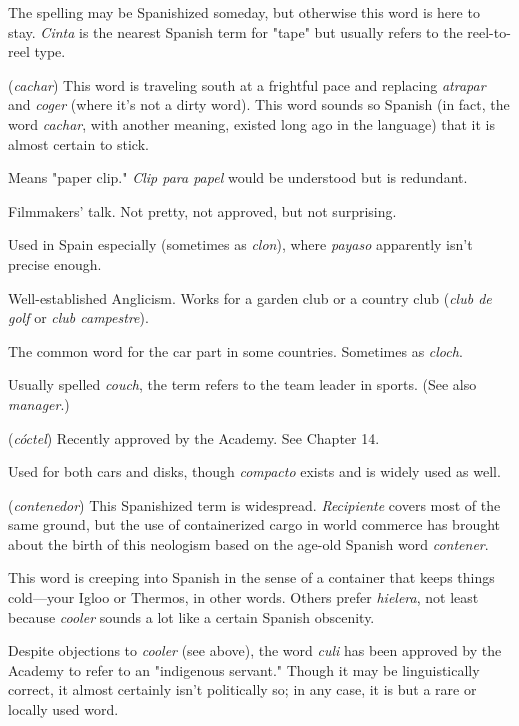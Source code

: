  The spelling may be Spanishized someday, but
otherwise this word is here to stay. \emph{Cinta} is the nearest Spanish term
for "tape" but usually refers to the reel-to-reel type.

 (\emph{cachar}) This word is traveling south at a frightful
pace and replacing \emph{atrapar} and \emph{coger} (where it's not a dirty word).
This word sounds so Spanish (in fact, the word \emph{cachar}, with another
meaning, existed long ago in the language) that it is almost certain to
stick.

 Means "paper clip." \emph{Clip para papel} would be understood but is redundant.

 Filmmakers' talk. Not pretty, not approved, but
not surprising.

 Used in Spain especially (sometimes as \emph{clon}), where
\emph{payaso} apparently isn't precise enough.

 Well-established Anglicism. Works for a garden club or
a country club (\emph{club de golf} or \emph{club campestre}).

 The common word for the car part in some countries. Sometimes as \emph{cloch}.

 Usually spelled \emph{couch}, the term refers to the team
leader in sports. (See also \emph{manager}.)

 (\emph{cóctel}) Recently approved by the Academy. See
Chapter 14.

 Used for both cars and disks, though \emph{compacto} exists and is widely used as well.

 (\emph{contenedor}) This Spanishized term is widespread. \emph{Recipiente} covers most of the same ground, but the use of containerized cargo in world commerce has brought about the birth of this
neologism based on the age-old Spanish word \emph{contener}.

 This word is creeping into Spanish in the sense of
a container that keeps things cold---your Igloo or Thermos, in other
words. Others prefer \emph{hielera}, not least because \emph{cooler} sounds a lot like
a certain Spanish obscenity.

 Despite objections to \emph{cooler} (see above), the word
\emph{culi} has been approved by the Academy to refer to an "indigenous servant." Though it may be linguistically correct, it almost certainly isn't
politically so; in any case, it is but a rare or locally used word.

